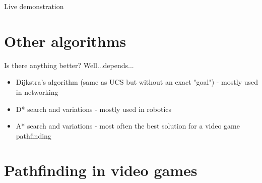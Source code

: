 \documentclass{beamer}
\begin{document}
\begin{frame}
	\centering
	Live demonstration
\end{frame}

\section{Other algorithms}

\begin{frame}{Is there anything better?}
	\pause
	Well...depends...
	\pause
	\begin{itemize}
		\item Dijkstra's algorithm (same as UCS but without an exact "goal") - mostly used in networking
		\pause
		\item D* search and variations - mostly used in robotics
		\pause
		\item A* search and variations - most often the best solution for a video game pathfinding
	\end{itemize}
\end{frame}

\section{Pathfinding in video games}
\end{document}

